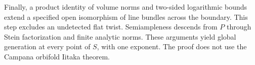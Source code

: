 Finally, a product identity of volume norms and two-sided logarithmic
bounds extend a specified open isomorphism of line bundles across the
boundary. This step excludes an undetected flat twist.
Semiampleness descends from \(P\) through Stein factorization and finite
analytic norms. These arguments yield global generation at every point
of \(S\), with one exponent.
The proof does not use the Campana orbifold Iitaka theorem.
